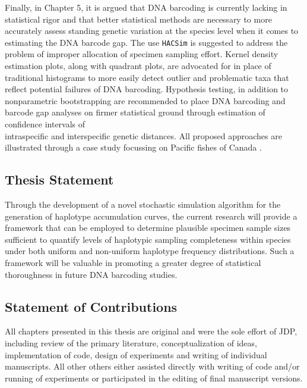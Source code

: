 Finally, in Chapter 5, it is argued that DNA barcoding is currently lacking in statistical rigor and that better statistical methods are necessary to more accurately assess standing genetic variation at the species level when it comes to estimating the DNA barcode gap. The use {\tt HACSim} is suggested to address the problem of improper allocation of specimen sampling effort. Kernel density estimation plots, along with quadrant plots, are advocated for in place of traditional histograms to more easily detect outlier and problematic taxa that reflect potential failures of DNA barcoding. Hypothesis testing, in addition to \\ nonparametric bootstrapping are recommended to place DNA barcoding and barcode gap analyses on firmer statistical ground through estimation of confidence intervals of \\ intraspecific and interspecific genetic distances. All proposed approaches are illustrated through a case study focussing on Pacific fishes of Canada \cite{steinke2009dna}.

\vspace{5mm}

\subsection{Thesis Statement}

Through the development of a novel stochastic simulation algorithm for the generation of haplotype accumulation curves, the current research will provide a framework that can be employed to determine plausible specimen sample sizes sufficient to quantify levels of haplotypic sampling completeness within species under both uniform and non-uniform haplotype frequency distributions. Such a framework will be valuable in promoting a greater degree of statistical \\ thoroughness in future DNA barcoding studies. 

\vspace{5mm}

\subsection{Statement of Contributions}
  
All chapters presented in this thesis are original and were the sole effort of JDP, \\ including review of the primary literature, conceptualization of ideas, implementation of code, design of experiments and writing of individual manuscripts. All other others either assisted directly with writing of code and/or running of experiments or participated in the editing of final manuscript versions.

